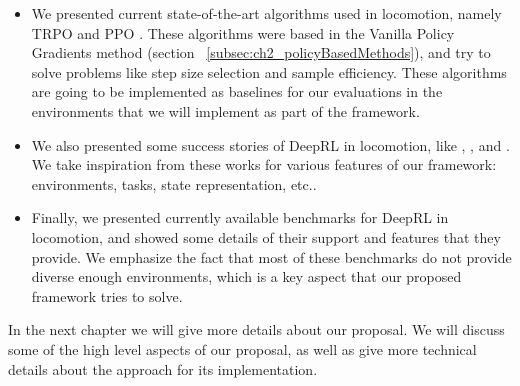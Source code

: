 \begin{itemize}
    \item We presented current state-of-the-art algorithms used in locomotion, 
          namely TRPO \citep{TRPO} and PPO \citep{PPO}. These algorithms were
          based in the Vanilla Policy Gradients method (section ~\ref{subsec:ch2_policyBasedMethods}), 
          and try to solve problems like step size selection and sample efficiency.
          These algorithms are going to be implemented as baselines for our evaluations
          in the environments that we will implement as part of the framework.

    \item We also presented some success stories of DeepRL in locomotion, like
          \citet{Rllab}, \citet{DeepTerrainRL}, \citet{DeepLoco} and \citet{DeepmindEmergenceLocomotion}.
          We take inspiration from these works for various features of our framework:
          environments, tasks, state representation, etc..

    \item Finally, we presented currently available benchmarks for DeepRL in locomotion,
          and showed some details of their support and features that they provide. We
          emphasize the fact that most of these benchmarks do not provide diverse
          enough environments, which is a key aspect that our proposed framework
          tries to solve.
\end{itemize}

In the next chapter we will give more details about our proposal. We will discuss
some of the high level aspects of our proposal, as well as give more technical details
about the approach for its implementation.